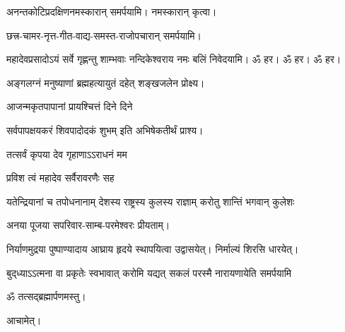 \begin{center}
अनन्तकोटिप्रदक्षिणनमस्कारान् समर्पयामि। नमस्कारान् कृत्वा।\medskip

छत्त्र-चामर-नृत्त-गीत-वाद्य-समस्त-राजोपचारान् समर्पयामि।\medskip


{महादेवप्रसादोऽयं सर्वे गृह्णन्तु शाम्भवाः}
नन्दिकेश्वराय नमः बलिं निवेदयामि। ॐ हर। ॐ हर। ॐ हर।\medskip

{अङ्गलग्नं मनुष्याणां ब्रह्महत्यायुतं दहेत्}
शङ्खजलेन प्रोक्ष्य।

{आजन्मकृतपापानां प्रायश्चित्तं दिने दिने}

{सर्वपापक्षयकरं शिवपादोदकं शुभम्}
इति अभिषेकतीर्थं प्राश्य।

{तत्सर्वं कृपया देव गृहाणाऽऽराधनं मम}

{प्रविश त्वं महादेव सर्वैरावरणैः सह}

{यतेन्द्रियानां च तपोधनानाम्}
{देशस्य राष्ट्रस्य कुलस्य राज्ञाम्}
{करोतु शान्तिं भगवान् कुलेशः}


अनया पूजया सपरिवार-साम्ब-परमेश्वरः प्रीयताम्। 



निर्याणमुद्रया पुष्पाण्यादाय आघ्राय हृदये स्थापयित्वा उद्वासयेत्। निर्माल्यं शिरसि धारयेत्।





{बुद्‌ध्याऽऽत्मना वा प्रकृतेः स्वभावात्}
{करोमि यद्यत् सकलं परस्मै}
{नारायणायेति समर्पयामि}


ॐ तत्सद्ब्रह्मार्पणमस्तु।\medskip

आचामेत्।

\end{center}
\closesection
\clearpage